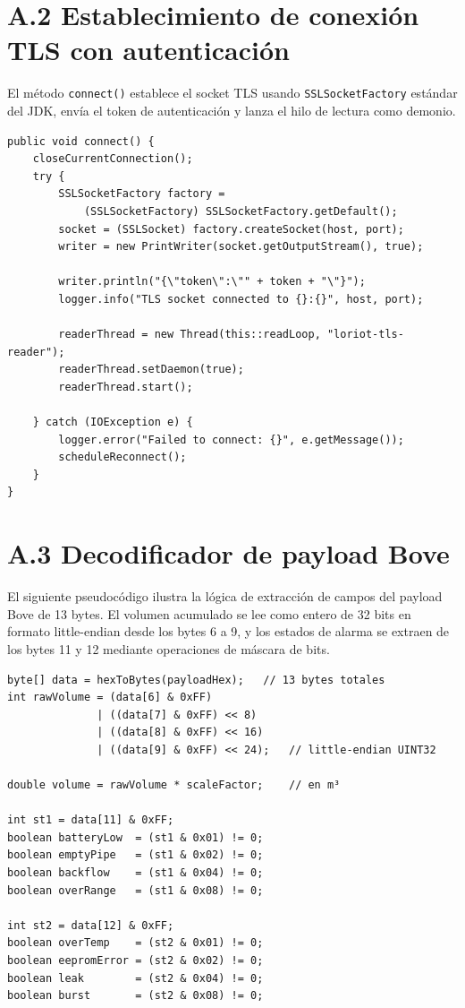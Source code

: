 \documentclass[12pt,a4paper,oneside]{report}
\begin{document}
\section*{A.2 Establecimiento de conexión TLS con autenticación}

El método \texttt{connect()} establece el socket TLS usando \texttt{SSLSocketFactory} estándar del JDK, envía el token de autenticación y lanza el hilo de lectura como demonio.

\begin{verbatim}
public void connect() {
    closeCurrentConnection();
    try {
        SSLSocketFactory factory =
            (SSLSocketFactory) SSLSocketFactory.getDefault();
        socket = (SSLSocket) factory.createSocket(host, port);
        writer = new PrintWriter(socket.getOutputStream(), true);

        writer.println("{\"token\":\"" + token + "\"}");
        logger.info("TLS socket connected to {}:{}", host, port);

        readerThread = new Thread(this::readLoop, "loriot-tls-reader");
        readerThread.setDaemon(true);
        readerThread.start();

    } catch (IOException e) {
        logger.error("Failed to connect: {}", e.getMessage());
        scheduleReconnect();
    }
}
\end{verbatim}

\section*{A.3 Decodificador de payload Bove}

El siguiente pseudocódigo ilustra la lógica de extracción de campos del payload Bove de 13 bytes. El volumen acumulado se lee como entero de 32 bits en formato little-endian desde los bytes 6 a 9, y los estados de alarma se extraen de los bytes 11 y 12 mediante operaciones de máscara de bits.

\begin{verbatim}
byte[] data = hexToBytes(payloadHex);   // 13 bytes totales
int rawVolume = (data[6] & 0xFF)
              | ((data[7] & 0xFF) << 8)
              | ((data[8] & 0xFF) << 16)
              | ((data[9] & 0xFF) << 24);   // little-endian UINT32

double volume = rawVolume * scaleFactor;    // en m³

int st1 = data[11] & 0xFF;
boolean batteryLow  = (st1 & 0x01) != 0;
boolean emptyPipe   = (st1 & 0x02) != 0;
boolean backflow    = (st1 & 0x04) != 0;
boolean overRange   = (st1 & 0x08) != 0;

int st2 = data[12] & 0xFF;
boolean overTemp    = (st2 & 0x01) != 0;
boolean eepromError = (st2 & 0x02) != 0;
boolean leak        = (st2 & 0x04) != 0;
boolean burst       = (st2 & 0x08) != 0;
\end{verbatim}
\end{document}
